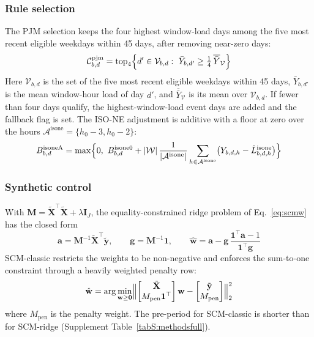 \subsubsection*{Rule selection}
The PJM selection keeps the four highest window-load days among the five most recent eligible weekdays within 45 days, after removing near-zero days:
\begin{equation}\label{eq:B3}
\mathcal{C}^{\mathrm{pjm}}_{b,d}=\operatorname{top}_{4}\Bigl\{d'\in\mathcal{V}_{b,d}:\ \bar{Y}_{b,d'}\ge \tfrac{1}{4}\,\overline{\bar{Y}}_{\mathcal{V}}\Bigr\}
\end{equation}
Here $\mathcal{V}_{b,d}$ is the set of the five most recent eligible weekdays within 45 days, $\bar{Y}_{b,d'}$ is the mean window-hour load of day $d'$, and $\overline{\bar{Y}}_{\mathcal{V}}$ is its mean over $\mathcal{V}_{b,d}$. If fewer than four days qualify, the highest-window-load event days are added and the fallback flag is set. The ISO-NE adjustment is additive with a floor at zero over the hours $\mathcal{A}^{\mathrm{isone}}=\{h_0-3,h_0-2\}$:
\begin{equation}\label{eq:B4}
B^{\mathrm{isoneA}}_{b,d}=\max\Bigl\{0,\ B^{\mathrm{isone0}}_{b,d}+\lvert\mathcal{W}\rvert\,\frac{1}{\lvert\mathcal{A}^{\mathrm{isone}}\rvert}\sum_{h\in\mathcal{A}^{\mathrm{isone}}}\bigl(Y_{b,d,h}-\hat{L}^{\mathrm{isone}}_{b,d,h}\bigr)\Bigr\}
\end{equation}

\subsubsection*{Synthetic control}
With $\mathbf{M}=\tilde{\mathbf{X}}^{\top}\tilde{\mathbf{X}}+\lambda\mathbf{I}_{J}$, the equality-constrained ridge problem of Eq.~\eqref{eq:scmw} has the closed form
\begin{equation}\label{eq:B5}
\mathbf{a}=\mathbf{M}^{-1}\tilde{\mathbf{X}}^{\top}\tilde{\mathbf{y}},\qquad \mathbf{g}=\mathbf{M}^{-1}\mathbf{1},\qquad \hat{\mathbf{w}}=\mathbf{a}-\mathbf{g}\,\frac{\mathbf{1}^{\top}\mathbf{a}-1}{\mathbf{1}^{\top}\mathbf{g}}
\end{equation}
SCM-classic restricts the weights to be non-negative and enforces the sum-to-one constraint through a heavily weighted penalty row:
\begin{equation}\label{eq:B6}
\hat{\mathbf{w}}=\arg\min_{\mathbf{w}\ge\mathbf{0}}\Bigl\lVert\begin{bmatrix}\tilde{\mathbf{X}}\\ M_{\mathrm{pen}}\mathbf{1}^{\top}\end{bmatrix}\mathbf{w}-\begin{bmatrix}\tilde{\mathbf{y}}\\ M_{\mathrm{pen}}\end{bmatrix}\Bigr\rVert_{2}^{2}
\end{equation}
where $M_{\mathrm{pen}}$ is the penalty weight. The pre-period for SCM-classic is shorter than for SCM-ridge (Supplement Table~\ref{tabS:methodsfull}).

